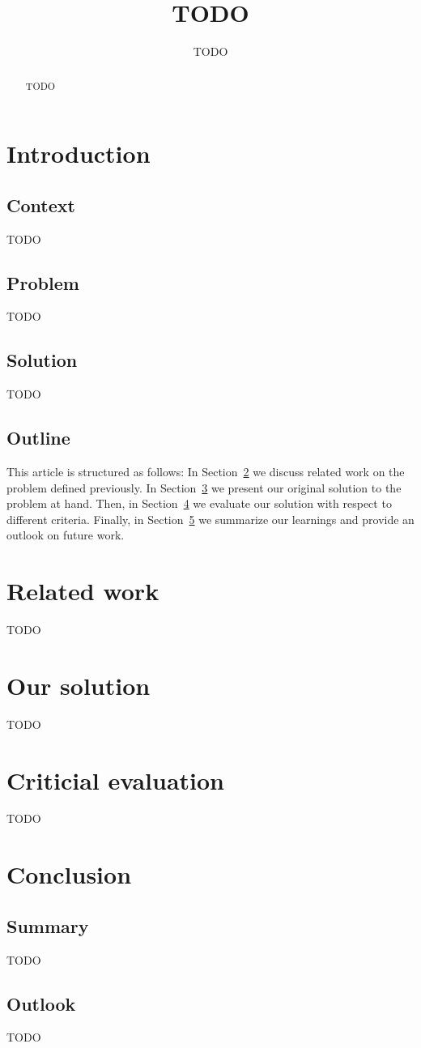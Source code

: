 \documentclass{IEEEtran}
\title{TODO}
\author{TODO}
\begin{document}
    \maketitle

    \begin{abstract}
        TODO
    \end{abstract}
    
    \section{Introduction}
    \label{sec:introduction}

    \subsection*{Context}
    TODO~\cite{Hackenberg2014}~\cite{Legat2014}~\cite{Teufl2015}

    \subsection*{Problem}
    TODO

    \subsection*{Solution}
    TODO

    \subsection*{Outline}
    This article is structured as follows:
    In Section~\ref{sec:differentiation} we discuss related work on the problem defined previously.
    In Section~\ref{sec:contribution} we present our original solution to the problem at hand.
    Then, in Section~\ref{sec:evaluation} we evaluate our solution with respect to different criteria.
    Finally, in Section~\ref{sec:conclusion} we summarize our learnings and provide an outlook on future work.
    
    \section{Related work}
    \label{sec:differentiation}
    TODO
    
    \section{Our solution}
    \label{sec:contribution}
    TODO
    
    \section{Criticial evaluation}
    \label{sec:evaluation}
    TODO

    \section{Conclusion}
    \label{sec:conclusion}

    \subsection*{Summary}
    TODO

    \subsection*{Outlook}
    TODO

    
    
\end{document}
